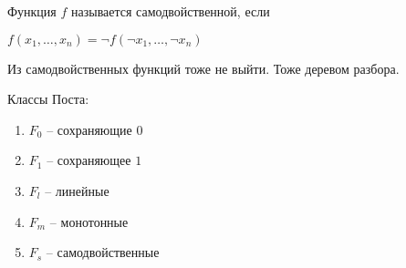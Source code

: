 \documentclass{book}
\theoremstyle{definition}
\begin{document}
    \begin{definition}
        Функция $f$ называется самодвойственной, если

        $f(x_1, \ldots, x_{n} ) = \neg f(\neg x_1, \ldots, \neg x_{n} )$ 
    \end{definition}
        
    \begin{statement}
        Из самодвойственных функций тоже не выйти. Тоже деревом разбора.
    \end{statement}
    Классы Поста:
    \begin{enumerate}
        \item $F_0$ -- сохраняющие $0$
        \item $F_1$ -- сохраняющее $1$
        \item $F_l$ -- линейные
        \item $F_m$ -- монотонные
        \item $F_s$ -- самодвойственные
    \end{enumerate}
\end{document}
